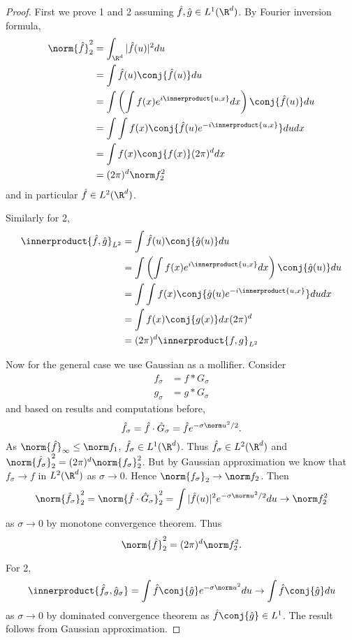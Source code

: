 \documentclass[a4paper]{article}
\newcommand*{\ip}{\innerproduct} %
\begin{document}
\begin{proof}
  First we prove 1 and 2 assuming \(\hat f, \hat g \in L^1(\R^d)\). By Fourier inversion formula,
  \begin{align*}
    \norm{\hat f}_2^2
    &= \int_{\R^d} |\hat f(u)|^2 du \\
    &= \int \hat f(u) \conj{\hat f(u)} du \\
    &= \int \left(\int f(x) e^{i \ip{u, x}} dx \right) \conj{\hat f(u)} du \\
    &= \int \int f(x) \conj{\hat f(u) e^{-i \ip{u, x}}} du dx \\
    &= \int f(x) \conj{f(x)} (2\pi)^d dx \\
    &= (2\pi)^d \norm f_2^2
  \end{align*}
  and in particular \(\hat f \in L^2(\R^d)\).

  Similarly for 2,
  \begin{align*}
    \ip{\hat f, \hat g}_{L^2}
    &= \int \hat f(u) \conj{\hat g(u)} du \\
    &= \int \left(\int f(x) e^{i \ip{u, x}} dx\right) \conj{\hat g(u)} du \\
    &= \int \int f(x) \conj{\hat g(u) e^{-i \ip{u, x}}} du dx \\
    &= \int f(x) \conj{g(x)} dx (2\pi)^d \\
    &= (2\pi)^d \ip{f, g}_{L^2}
  \end{align*}

  Now for the general case we use Gaussian as a mollifier. Consider
  \begin{align*}
    f_\sigma &= f * G_\sigma \\
    g_\sigma &= g * G_\sigma
  \end{align*}
  and based on results and computations before,
  \[
    \hat f_\sigma
    = \hat f \cdot \hat G_\sigma
    = \hat f e^{-\sigma \norm u^2/2}.
  \]
  As \(\norm{\hat f}_\infty \leq \norm f_1\), \(\hat f_\sigma \in L^1(\R^d)\). Thus \(\hat f_\sigma \in L^2(\R^d)\) and \(\norm{\hat f_\sigma}_2^2 = (2\pi)^d \norm{f_\sigma}^2_2\). But by Gaussian approximation we know that \(f_\sigma \to f\) in \(L^2(\R^d)\) as \(\sigma \to 0\). Hence \(\norm{f_\sigma}_2 \to \norm f_2\). Then
  \[
    \norm{\hat f_\sigma}_2^2
    = \norm{\hat f \cdot \hat G_\sigma}_2^2
    = \int |\hat f(u)|^2 e^{-\sigma \norm u^2/2} du
    \to \norm f^2_2
  \]
  as \(\sigma \to 0\) by monotone convergence theorem. Thus
  \[
    \norm{\hat f}_2^2 = (2\pi)^d \norm f_2^2.
  \]

  For 2,
  \[
    \ip{\hat f_\sigma, \hat g_\sigma}
    = \int \hat f \conj{\hat g} e^{-\sigma \norm u^2} du
    \to \int \hat f \conj{\hat g} du
  \]
  as \(\sigma \to 0\) by dominated convergence theorem as \(\hat f \conj{\hat g} \in L^1\). The result follows from Gaussian approximation.


\end{proof}
\end{document}
